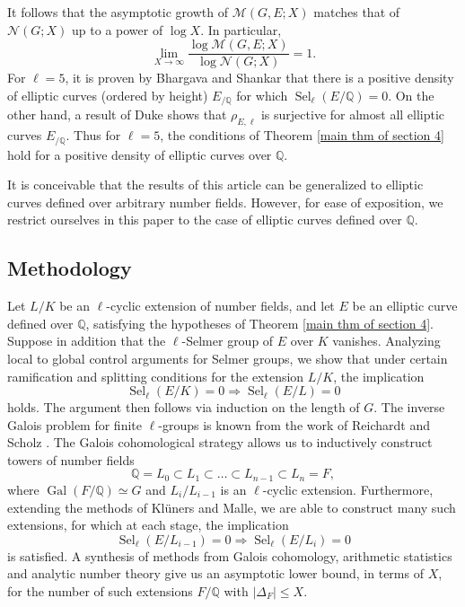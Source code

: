 \documentclass[11pt,reqno]{amsart}
\newcommand{\Q}{\mathbb{Q}}
\newcommand{\op}[1]{\operatorname{#1}}
\numberwithin{equation}{section}
\begin{document}
It follows that the asymptotic growth of \( \mathcal{M}(G, E; X) \) matches that of \( \mathcal{N}(G; X) \) up to a power of \( \log X \). In particular,
\[
\lim_{X \to \infty} \frac{\log \mathcal{M}(G, E; X)}{\log \mathcal{N}(G; X)} = 1.
\]
For $\ell=5$, it is proven by Bhargava and Shankar \cite{bhargavashankar5} that there is a positive density of elliptic curves (ordered by height) $E_{/\Q}$ for which $\op{Sel}_\ell(E/\Q)=0$. On the other hand, a result of Duke \cite{duke} shows that $\rho_{E,\ell}$ is surjective for almost all elliptic curves $E_{/\Q}$. Thus for $\ell=5$, the conditions of Theorem \ref{main thm of section 4} hold for a positive density of elliptic curves over $\mathbb{Q}$.
\par It is conceivable that the results of this article can be generalized to elliptic curves defined over arbitrary number fields. However, for ease of exposition, we restrict ourselves in this paper to the case of elliptic curves defined over $\Q$.



\subsection{Methodology}
Let \( L/K \) be an \( \ell \)-cyclic extension of number fields, and let \( E \) be an elliptic curve defined over \( \Q \), satisfying the hypotheses of Theorem \ref{main thm of section 4}. Suppose in addition that the \( \ell \)-Selmer group of \( E \) over \( K \) vanishes. Analyzing local to global control arguments for Selmer groups, we show that under certain ramification and splitting conditions for the extension $L/K$, the implication
\[
\operatorname{Sel}_\ell(E/K) = 0  \Rightarrow  \operatorname{Sel}_\ell(E/L) = 0
\]
holds. The argument then follows via induction on the length of $G$. The inverse Galois problem for finite $\ell$-groups is known from the work of Reichardt \cite{Reichardt} and Scholz \cite{Scholz}. The Galois cohomological strategy allows us to inductively construct towers of number fields 
\[\Q=L_0\subset L_1\subset \dots \subset L_{n-1}\subset L_n=F,\] where $\op{Gal}(F/\Q)\simeq G$ and $L_i/L_{i-1}$ is an $\ell$-cyclic extension. Furthermore, extending the methods of Kl\"uners and Malle, we are able to construct many such extensions, for which at each stage, the implication 
\[\op{Sel}_\ell(E/L_{i-1})=0\Rightarrow \op{Sel}_\ell(E/L_{i})=0\]
is satisfied. A synthesis of methods from Galois cohomology, arithmetic statistics and analytic number theory give us an asymptotic lower bound, in terms of $X$, for the number of such extensions $F/\Q$ with $|\Delta_F|\leq X$.
\end{document}
